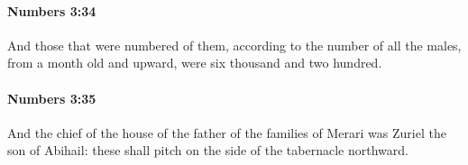 		\paragraph{Numbers 3:34} %
			\label{NUMBERS-3-34}

			And those that were numbered of them, according to the number of all the males, from a month old and upward, were six thousand and two hundred.


		\paragraph{Numbers 3:35} %
			\label{NUMBERS-3-35}

			And the chief of the house of the father of the families of Merari was Zuriel the son of Abihail: these shall pitch on the side of the tabernacle northward.


